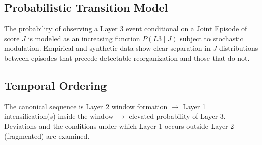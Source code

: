 \subsection{Probabilistic Transition Model}

The probability of observing a Layer 3 event conditional on a Joint Episode of score $J$ is modeled as an increasing function $P(L3 \mid J)$ subject to stochastic modulation. Empirical and synthetic data show clear separation in $J$ distributions between episodes that precede detectable reorganization and those that do not.

\subsection{Temporal Ordering}

The canonical sequence is Layer 2 window formation $\to$ Layer 1 intensification(s) inside the window $\to$ elevated probability of Layer 3. Deviations and the conditions under which Layer 1 occurs outside Layer 2 (fragmented) are examined.
